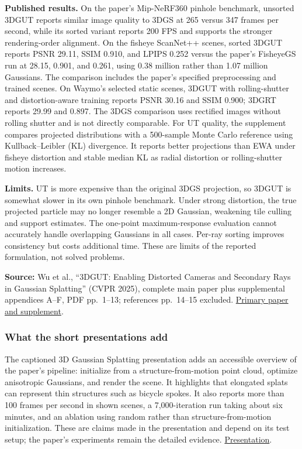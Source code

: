 \textbf{Published results.} On the paper's Mip-NeRF360 pinhole benchmark, unsorted 3DGUT reports similar image quality to 3DGS at 265 versus 347 frames per second, while its sorted variant reports 200 FPS and supports the stronger rendering-order alignment. On the fisheye ScanNet++ scenes, sorted 3DGUT reports PSNR 29.11, SSIM 0.910, and LPIPS 0.252 versus the paper's FisheyeGS run at 28.15, 0.901, and 0.261, using 0.38 million rather than 1.07 million Gaussians. The comparison includes the paper's specified preprocessing and trained scenes. On Waymo's selected static scenes, 3DGUT with rolling-shutter and distortion-aware training reports PSNR 30.16 and SSIM 0.900; 3DGRT reports 29.99 and 0.897. The 3DGS comparison uses rectified images without rolling shutter and is not directly comparable. For UT quality, the supplement compares projected distributions with a 500-sample Monte Carlo reference using Kullback--Leibler (KL) divergence. It reports better projections than EWA under fisheye distortion and stable median KL as radial distortion or rolling-shutter motion increases.

\textbf{Limits.} UT is more expensive than the original 3DGS projection, so 3DGUT is somewhat slower in its own pinhole benchmark. Under strong distortion, the true projected particle may no longer resemble a 2D Gaussian, weakening tile culling and support estimates. The one-point maximum-response evaluation cannot accurately handle overlapping Gaussians in all cases. Per-ray sorting improves consistency but costs additional time. These are limits of the reported formulation, not solved problems.

\textbf{Source:} Wu et al., ``3DGUT: Enabling Distorted Cameras and Secondary Rays in Gaussian Splatting'' (CVPR 2025), complete main paper plus supplemental appendices A--F, PDF pp.~1--13; references pp.~14--15 excluded. \href{https://research.nvidia.com/labs/toronto-ai/3DGUT/res/3DGUT_full_resolution.pdf}{Primary paper and supplement}.

\subsubsection{What the short presentations add}\label{04-visual-computing-ii-ch034-what-the-short-presentations-add}

\hypertarget{04-visual-computing-ii-ch034-what-the-short-presentations-add}{}

The captioned 3D Gaussian Splatting presentation adds an accessible overview of the paper's pipeline: initialize from a structure-from-motion point cloud, optimize anisotropic Gaussians, and render the scene. It highlights that elongated splats can represent thin structures such as bicycle spokes. It also reports more than 100 frames per second in shown scenes, a 7,000-iteration run taking about six minutes, and an ablation using random rather than structure-from-motion initialization. These are claims made in the presentation and depend on its test setup; the paper's experiments remain the detailed evidence. \href{https://www.youtube.com/watch?v=T_kXY43VZnk}{Presentation}.

